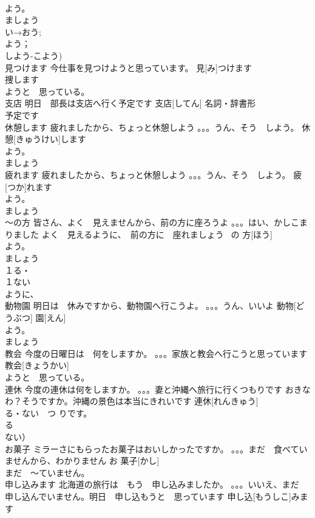 \documentclass[8pt]{extreport}
\begin{document}
\begin{CJK}{UTF8}{min}
\\	よう。
\\	ましょう	
\\	い→おう;
\\	よう；
\\	しよう-こよう)
\\	見つけます	今仕事を見つけようと思っています。	見[み]つけます			
\\	捜します	
\\	ようと　思っている。
\\	支店	明日　部長は支店へ行く予定です	支店[してん]				名詞・辞書形
\\	予定です
\\	休憩します	疲れましたから、ちょっと休憩しよう 。。。うん、そう　しよう。	休憩[きゅうけい]します				
\\	よう。
\\	ましょう	
\\	疲れます	疲れましたから、ちょっと休憩しよう 。。。うん、そう　しよう。	疲[つか]れます			
\\	よう。
\\	ましょう	
\\	～の方	皆さん、よく　見えませんから、前の方に座ろうよ 。。。はい、かしこまりました よく　見えるように、　前の方に　座れましょう	~の 方[ほう]				
\\	よう。
\\	ましょう 
\\	１る・
\\	１ない
\\	ように、
\\	動物園	明日は　休みですから、動物園へ行こうよ。 。。。うん、いいよ	動物[どうぶつ] 園[えん]				
\\	よう。
\\	ましょう		
\\	教会	今度の日曜日は　何をしますか。 。。。家族と教会へ行こうと思っています	教会[きょうかい]			
\\	ようと　思っている。
\\	連休	今度の連休は何をしますか。 。。。妻と沖縄へ旅行に行くつもりです おきなわ？そうですか。沖縄の景色は本当にきれいです	連休[れんきゅう]			
\\	る・ない　つ りです。
\\	る
\\	ない）
\\	お菓子	ミラーさにもらったお菓子はおいしかったですか。 。。。まだ　食べていませんから、わかりません	お 菓子[かし]			
\\	まだ　～ていません。
\\	申し込みます	北海道の旅行は　もう　申し込みましたか。 。。。いいえ、まだ　申し込んでいません。明日　申し込もうと　思っています	申し込[もうしこ]みます			

\end{CJK}
\end{document}
